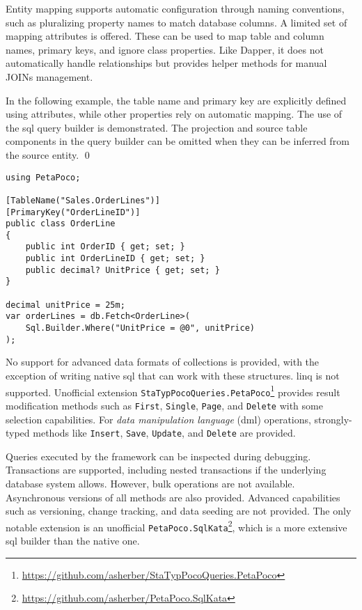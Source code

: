Entity mapping supports automatic configuration through naming conventions, such as pluralizing property names to match database columns. A limited set of mapping attributes is offered. These can be used to map table and column names, primary keys, and ignore class properties. Like Dapper, it does not automatically handle relationships but provides helper methods for manual JOINs management.

\begin{example}
\small
In the following example, the table name and primary key are explicitly defined using attributes, while other properties rely on automatic mapping. The use of the \acrshort{sql} query builder is demonstrated. The projection and source table components in the query builder can be omitted when they can be inferred from the source entity.
\qed

\begin{lstlisting}[language=CSharp]
using PetaPoco;

[TableName("Sales.OrderLines")]
[PrimaryKey("OrderLineID")]
public class OrderLine
{
    public int OrderID { get; set; }
    public int OrderLineID { get; set; }
    public decimal? UnitPrice { get; set; }
}

decimal unitPrice = 25m;
var orderLines = db.Fetch<OrderLine>(
    Sql.Builder.Where("UnitPrice = @0", unitPrice)
);
\end{lstlisting}
\end{example}

No support for advanced data formats of collections is provided, with the exception of writing native \acrshort{sql} that can work with these structures. \acrshort{linq} is not supported. Unofficial extension \texttt{StaTypPocoQueries.PetaPoco}\footnote{\url{https://github.com/asherber/StaTypPocoQueries.PetaPoco}} provides result modification methods such as \texttt{First}, \texttt{Single}, \texttt{Page}, and \texttt{Delete} with some selection capabilities. For \textit{data manipulation language} (\acrshort{dml}) operations, strongly-typed methods like \texttt{Insert}, \texttt{Save}, \texttt{Update}, and \texttt{Delete} are provided. 

Queries executed by the framework can be inspected during debugging. Transactions are supported, including nested transactions if the underlying database system allows. However, bulk operations are not available. Asynchronous versions of all methods are also provided. Advanced capabilities such as versioning, change tracking, and data seeding are not provided. The only notable extension is an unofficial \texttt{PetaPoco.SqlKata}\footnote{\url{https://github.com/asherber/PetaPoco.SqlKata}}, which is a more extensive \acrshort{sql} builder than the native one.

